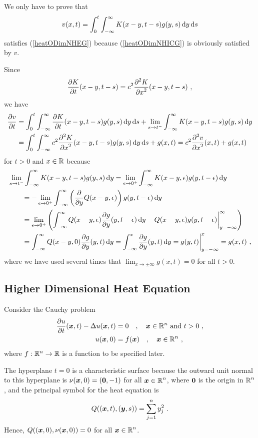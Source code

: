 We only have to prove that
\[
v(x,t) = \int_0^t \int_{-\infty}^{\infty} K(x-y,t-s) g(y,s) \dx{y}\dx{s}
\]
satisfies (\ref{heatODimNHEG}) because (\ref{heatODimNHICG}) is
obviously satisfied by $v$.

Since
\[
\pdydx{K}{t}(x-y,t-s) = c^2 \pdydxn{K}{x}{2}(x-y,t-s) \ ,
\]
we have
\begin{align*}
\pdydx{v}{t} &= \int_0^t \int_{-\infty}^{\infty}
\pdydx{K}{t}(x-y, t-s) g(y,s) \dx{y}\dx{s} 
+ \lim_{s\to t^-} \int_{-\infty}^{\infty} K(x-y,t-s)g(y,s) \dx{y} \\
& = \int_0^t \int_{-\infty}^{\infty} c^2
\pdydxn{K}{x}{2}(x-y, t-s) g(y,s) \dx{y}\dx{s} + g(x,t)
= c^2 \pdydxn{v}{x}{2}(x,t) + g(x,t)
\end{align*}
for $t>0$ and $x\in \RR$ because
\begin{align*}
& \lim_{s\to t^-} \int_{-\infty}^{\infty} K(x-y,t-s)g(y,s) \dx{y}
= \lim_{\epsilon \to 0^+} \int_{-\infty}^{\infty}
K(x-y,\epsilon)g(y,t-\epsilon) \dx{y} \\
& \qquad = -\lim_{\epsilon \to 0^+} \int_{-\infty}^{\infty}
\left(\pdfdx{Q(x-y,\epsilon)}{y}\right) g(y,t-\epsilon) \dx{y} \\
& \qquad = \lim_{\epsilon \to 0^+} \left( \int_{-\infty}^{\infty} Q(x-y,\epsilon)
\pdydx{g}{y}(y,t-\epsilon) \dx{y}
- Q(x-y,\epsilon) g(y,t-\epsilon) \bigg|_{y=-\infty}^{\infty} \right) \\
& \qquad = \int_{-\infty}^{\infty} Q(x-y,0) \pdydx{g}{y}(y,t) \dx{y}
= \int_{-\infty}^x \pdydx{g}{y}(y,t) \dx{y}
= g(y,t) \bigg|_{y=-\infty}^x = g(x,t) \ ,
\end{align*}
where we have used several times that
$\displaystyle \lim_{x\to \pm\infty} g(x,t) = 0$ for all $t>0$.

\subsection{Higher Dimensional Heat Equation}

Consider the Cauchy problem
\begin{align}
\pdydx{u}{t}(\VEC{x},t) - \Delta u(\VEC{x},t) &= 0 \quad , \quad
\VEC{x} \in \RR^n \ \text{and} \ t> 0 \ , \label{heat_cauchyA} \\
u(\VEC{x},0) &= f(\VEC{x}) \quad , \quad \VEC{x} \in \RR^n \ ,
\label{heat_cauchyB} 
\end{align}
where $f:\RR^n\rightarrow \RR$ is a function to be specified later.

\begin{rmk}
The hyperplane $t=0$ is a characteristic surface because the outward
unit normal to this hyperplane is $\nu(\VEC{x},0) = (\VEC{0},-1)$ for
all $\displaystyle \VEC{x} \in \RR^n$, where $\VEC{0}$ is the origin
in $\displaystyle \RR^n$, and 
the principal symbol for the heat equation is
\[
Q((\VEC{x},t), (\VEC{y},s)) = \sum_{j=1}^n y_j^2 \ .
\]
Hence, $\displaystyle Q((\VEC{x},0), \nu(\VEC{x},0)) = 0$ for
all $\displaystyle \VEC{x} \in \RR^n$.
\end{rmk}

